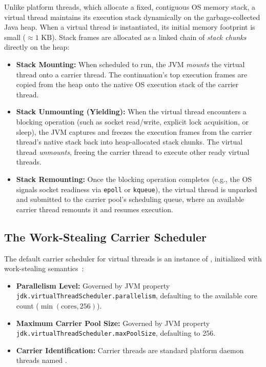 Unlike platform threads, which allocate a fixed, contiguous OS memory stack, a virtual thread maintains its execution stack dynamically on the garbage-collected Java heap. When a virtual thread is instantiated, its initial memory footprint is small ($\approx 1\text{ KB}$). Stack frames are allocated as a linked chain of \emph{stack chunks} directly on the heap:
\begin{itemize}
  \item \textbf{Stack Mounting:} When scheduled to run, the JVM \emph{mounts} the virtual thread onto a carrier thread. The continuation's top execution frames are copied from the heap onto the native OS execution stack of the carrier thread.
  \item \textbf{Stack Unmounting (Yielding):} When the virtual thread encounters a blocking operation (such as socket read/write, explicit lock acquisition, or sleep), the JVM captures and freezes the execution frames from the carrier thread's native stack back into heap-allocated stack chunks. The virtual thread \emph{unmounts}, freeing the carrier thread to execute other ready virtual threads.
  \item \textbf{Stack Remounting:} Once the blocking operation completes (e.g., the OS signals socket readiness via \texttt{epoll} or \texttt{kqueue}), the virtual thread is unparked and submitted to the carrier pool's scheduling queue, where an available carrier thread remounts it and resumes execution.
\end{itemize}

\subsection{The Work-Stealing Carrier Scheduler}
The default carrier scheduler for virtual threads is an instance of , initialized with work-stealing semantics~\cite{Lea2000FJ}:
\begin{itemize}
  \item \textbf{Parallelism Level:} Governed by JVM property\\ \texttt{jdk.virtualThreadScheduler.parallelism}, defaulting to the available core count ($\min(\text{cores}, 256)$).
  \item \textbf{Maximum Carrier Pool Size:} Governed by JVM property\\ \texttt{jdk.virtualThreadScheduler.maxPoolSize}, defaulting to 256.
  \item \textbf{Carrier Identification:} Carrier threads are standard platform daemon threads named .
\end{itemize}


